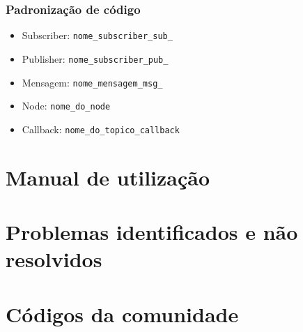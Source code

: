 \subsubsection*{Padronização de código}



	
	\begin{itemize}
		\item Subscriber: \texttt{nome\_subscriber\_sub\_}
		\item Publisher: \texttt{nome\_subscriber\_pub\_}
		\item Mensagem: \texttt{nome\_mensagem\_msg\_}
		\item Node: \texttt{nome\_do\_node}
		\item Callback: \texttt{nome\_do\_topico\_callback}
		
	\end{itemize}

\clearpage

\section{Manual de utilização}



\clearpage


\section{Problemas identificados e não resolvidos}



\clearpage


\section{Códigos da comunidade}